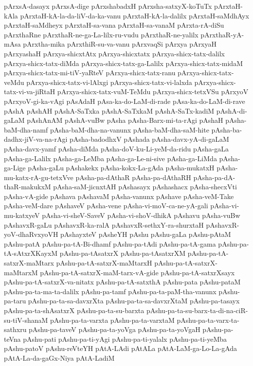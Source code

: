 {pArxsA-dasayx
pArxsA-dige
pArxshabadxH
pArxsha-satxyX-koTuTx
pArxtaH-kAla
pArxtaH-kA-la-da-liV-da-ka-vanu
pArxtaH-kA-la-dalilx
pArxtaH-saMdhAyx
pArxtaH-saMdheyx
pArxtaH-sa-vana
pArxtaH-sa-vanaM
pArxta-rA-diSu
pArxthaRne
pArxthaR-ne-ga-La-lilx-ru-vudu
pArxthaR-ne-yalilx
pArxthaR-yA-mAsa
pArxtha-mika
pArxthiR-su-va-vanu
pArxvaqSi
pArxya
pArxyaH
pArxyashaH
pArxya-shicxtAtx
pArxya-shicxtatx
pArxya-shicx-tatx-dalilx
pArxya-shicx-tatx-diMda
pArxya-shicx-tatx-ga-Lalilx
pArxya-shicx-tatx-midaM
pArxya-shicx-tatx-mi-tiV-yaRteV
pArxya-shicx-tatx-ranu
pArxya-shicx-tatx-veMdu
pArxya-shicx-tatx-vi-lAlxgi
pArxya-shicx-tatx-vi-lalxda
pArxya-shicx-tatx-vi-va-jiRtaH
pArxya-shicx-tatx-vuM-TeMdu
pArxya-shicx-tetxVSu
pArxyoV
pArxyoV-gi-ka-vAgi
pAsAdaH
pAsa-ka-do-LaM-di-rade
pAsa-ka-do-LaM-di-rave
pAshA
pAshAH
pAshA-SaTxka
pAshA-SaTxkaM
pAshA-SaTx-kadiM
pAshA-di-gaLaM
pAshAnAM
pAshA-vuBw
pAsha
pAsha-Barx-mi-ta-rAgi
pAshaH
pAsha-baM-dha-namf
pAsha-baM-dha-na-vanunx
pAsha-baM-dha-saM-hite
pAsha-ba-dadhx-jiV-va-na-rAgi
pAsha-badodhxV
pAshada
pAsha-davx-yA-di-gaLaM
pAsha-davx-yamf
pAsha-diMda
pAsha-doV-ku-Li-yeM-da-ridu
pAsha-gaLa
pAsha-ga-Lalilx
pAsha-ga-LeMba
pAsha-ga-Le-ni-sive
pAsha-ga-LiMda
pAsha-ga-Lige
pAsha-gaLu
pAshakekx
pAsha-kokx-La-gAda
pAsha-mukatxH
pAsha-mu-katx-rA-gu-tetxVve
pAsha-pa-dAthaR
pAsha-pa-dAthaRH
pAsha-pa-dA-thaR-makukxM
pAsha-saM-jicnxtAH
pAshasayx
pAshashacx
pAsha-shecxVti
pAsha-vA-gide
pAshava
pAshavaM
pAsha-vanunx
pAshave
pAsha-veM-Take
pAsha-veM-dare
pAshaveV
pAsha-vene
pAsha-vi-moV-ca-ne-yA-gali
pAsha-vi-mu-katxyeV
pAsha-vi-sheV-SaveV
pAsha-vi-shoV-dhikA
pAshavu
pAsha-vuBw
pAshavxR-gaLu
pAshavxR-ka-ralA
pAshavxR-sethxY-ra-shurxtaH
pAshavxR-yoV-dhaRvxyoVH
pAshayxteV
pAsheYH
pAshu
pAshu-gaLa
pAshu-pAtaM
pAshu-patA
pAshu-pa-tA-Bi-dhamf
pAshu-pa-tAdi
pAshu-pa-tA-gama
pAshu-pa-tA-sAtxrXKayxM
pAshu-pa-tAsatxrX
pAshu-pa-tAsatxrXM
pAshu-pa-tA-satxrX-maMtarx
pAshu-pa-tA-satxrX-maMtarxH
pAshu-pa-tA-satxrX-maMtarxM
pAshu-pa-tA-satxrX-maM-tarx-vA-gide
pAshu-pa-tA-satxrXsayx
pAshu-pa-tA-satxrX-va-nitatx
pAshu-pa-tA-satxthA
pAshu-pata
pAshu-pataM
pAshu-pa-ta-ma-ta-dalilx
pAshu-pa-tamf
pAshu-pa-ta-paM-tha-vanunx
pAshu-pa-taru
pAshu-pa-ta-sa-davxrXta
pAshu-pa-ta-sa-davxrXtaM
pAshu-pa-tasayx
pAshu-pa-ta-shAsatxrX
pAshu-pa-ta-su-barxta
pAshu-pa-ta-su-barx-ta-di-na-ciR-su-tiV-shanaM
pAshu-pa-ta-varxta
pAshu-pa-ta-varxtaM
pAshu-pa-ta-varx-ta-sathxru
pAshu-pa-taveV
pAshu-pa-ta-yoVga
pAshu-pa-ta-yoVgaH
pAshu-pa-teVna
pAshu-pati
pAshu-pa-ti-yAgi
pAshu-pa-ti-yalalx
pAshu-pa-ti-yeMba
pAshu-patoV
pAshu-reVteYH
pAtA-LAdi
pAtALa
pAtA-LaM-ga-Lo-La-gAda
pAtA-La-da-gaGx-Niya
pAtA-LadiM
}
